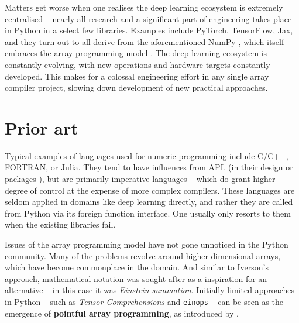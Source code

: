Matters get worse when one realises the deep learning ecosystem is extremely centralised -- nearly all research and a significant part of engineering takes place in Python in a select few libraries. Examples include PyTorch, TensorFlow, Jax, and they turn out to all derive from the aforementioned NumPy \cite{frostig2018compiling, paszke2019pytorch, abadi2016tensorflow}, which itself embraces the array programming model \cite{harris2020array}. 
The deep learning ecosystem is constantly evolving, with new operations and hardware targets constantly developed. This makes for a colossal engineering effort in any single array compiler project, slowing down development of new practical approaches.

\section{Prior art}

Typical examples of languages used for numeric programming include C/C++, FORTRAN, or Julia. 
They tend to have influences from APL (in their design \cite{bernecky1991fortran} or packages \cite{eigenweb}), but are primarily imperative languages -- which do grant higher degree of control at the expense of more complex compilers. 
These languages are seldom applied in domains like deep learning directly, and rather they are called from Python via its foreign function interface. One usually only resorts to them when the existing libraries fail.

Issues of the array programming model have not gone unnoticed in the Python community. Many of the problems revolve around higher-dimensional arrays, which have become commonplace in the domain. And similar to Iverson's approach, mathematical notation was sought after as a inspiration for an alternative -- in this case it was \textit{Einstein summation}. Initially limited approaches in Python -- such as \textit{Tensor Comprehensions} \cite{vasilache2018tensor} and \texttt{einops} \cite{rogozhnikov2021einops} -- can be seen as the emergence of \textbf{pointful array programming}, as introduced by \textcite{paszke2021getting}. 

